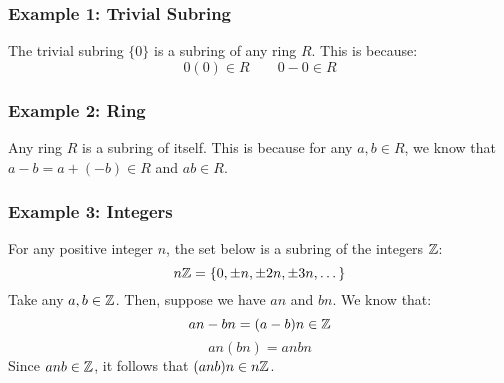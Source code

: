 \documentclass[letterpaper]{article}
\begin{document}
\subsubsection{Example 1: Trivial Subring}
The trivial subring $\{0\}$ is a subring of any ring $R$. This is because:
\[0(0) \in R \qquad 0 - 0 \in R\]

\subsubsection{Example 2: Ring}
Any ring $R$ is a subring of itself. This is because for any $a, b \in R$, we know that $a - b = a + (-b) \in R$ and $ab \in R$. 

\subsubsection{Example 3: Integers}
For any positive integer $n$, the set below is a subring of the integers $\mathbb{Z}$: 
\[n\mathbb{Z} = \{0, \pm n, \pm 2n, \pm 3n, \dots\}\]
Take any $a, b \in \mathbb{Z}$. Then, suppose we have $an$ and $bn$. We know that: 
\[an - bn = (a - b)n \in \mathbb{Z}\]
\[an(bn) = anbn\]
Since $anb \in \mathbb{Z}$, it follows that $(anb)n \in n\mathbb{Z}$. 
\end{document}
